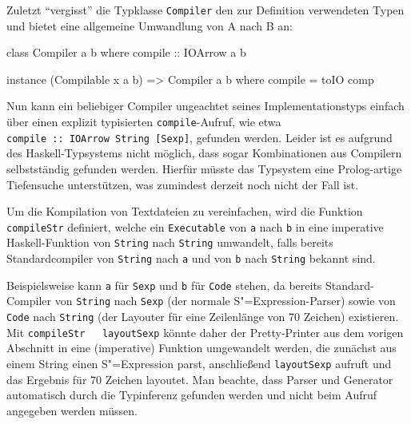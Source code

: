 \documentclass[11pt, a4paper, bibgerm]{scrbook}
\newenvironment{DIFnomarkup}{}{}
\newcommand\icode[1]{\lstinline?#1?}
\newcommand{\sexp}{S"=Expression}
\begin{document}
Zuletzt "`vergisst"' die Typklasse \icode{Compiler} den zur Definition
verwendeten Typen und bietet eine allgemeine Umwandlung von A nach B an:
\begin{DIFnomarkup}\begin{code}
class Compiler a b where
  compile :: IOArrow a b

instance (Compilable x a b) => Compiler a b where
  compile = toIO comp
\end{code}\end{DIFnomarkup}
Nun kann ein beliebiger Compiler ungeachtet seines Implementationstyps
einfach über einen explizit typisierten \icode{compile}-Aufruf, wie etwa
\\\icode{compile :: IOArrow String [Sexp]}, gefunden werden. Leider ist
es aufgrund des Haskell-Typsystems nicht möglich, dass sogar
Kombinationen aus Compilern selbstständig gefunden werden. Hierfür
müsste das Typsystem eine Prolog-artige Tiefensuche unterstützen, was
zumindest derzeit noch nicht der Fall ist. 

Um die Kompilation von Textdateien zu vereinfachen, wird die Funktion
\icode{compileStr} definiert, welche ein \icode{Executable} von
\icode{a} nach \icode{b} in eine imperative Haskell-Funktion von
\icode{String} nach \icode{String} umwandelt, falls bereits
Standardcompiler von \icode{String} nach \icode{a} und von \icode{b}
nach \icode{String} bekannt sind.   
\begin{DIFnomarkup}\end{DIFnomarkup} %
Beispielsweise kann \icode{a} für
\icode{Sexp} und \icode{b} für \icode{Code} stehen, da bereits
Standard-Compiler von \icode{String} nach \icode{Sexp} (der normale
\sexp{}-Parser) sowie von \icode{Code} nach \icode{String} (der Layouter
für eine Zeilenlänge von 70 Zeichen) existieren. Mit \icode{compileStr
  layoutSexp} könnte daher der Pretty-Printer aus dem vorigen
Abschnitt in eine (imperative) Funktion umgewandelt werden, die zunächst
aus einem String einen \sexp{} parst, anschließend \icode{layoutSexp} aufruft
und das Ergebnis für 70 Zeichen layoutet. Man beachte, dass Parser und
Generator automatisch durch die Typinferenz gefunden werden und nicht
beim Aufruf angegeben werden müssen.
\end{document}
